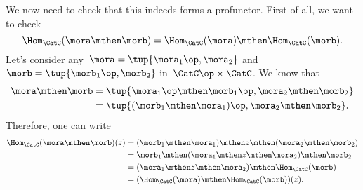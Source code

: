 We now need to check that this indeeds forms a profunctor. First of all, we want to check
\begin{equation}\label{eq:hom5}
    \Hom_\CatC(\mora \mthen \morb)=\Hom_\CatC(\mora)\mthen \Hom_\CatC(\morb).
\end{equation}
Let's consider any~$\mora=\tup{\mora_1\op, \mora_2}$ and~$\morb=\tup{\morb_1\op,\morb_2}$ in~$\CatC\op \times \CatC$.
We know that
\begin{equation}\label{eq:hom6}
    \begin{aligned}
    \mora\mthen \morb&=\tup{\mora_1\op \mthen \morb_1\op, \mora_2\mthen \morb_2}\\
        &=\tup{(\morb_1\mthen \mora_1)\op, \mora_2\mthen \morb_2}.
    \end{aligned}
\end{equation}
Therefore, one can write
\begin{equation}\label{eq:hom7}
\begin{aligned}
    \Hom_\CatC(\mora \mthen \morb)(z)&=(\morb_1\mthen \mora_1)\mthen z \mthen (\mora_2\mthen \morb_2)\\
    &=\morb_1\mthen (\mora_1\mthen z \mthen \mora_2) \mthen \morb_2\\
    &=(\mora_1\mthen z \mthen \mora_2)\mthen \Hom_\CatC(\morb)\\
    &=(\Hom_\CatC(\mora)\mthen \Hom_\CatC(\morb))(z).
\end{aligned}
\end{equation}
\devel{}

